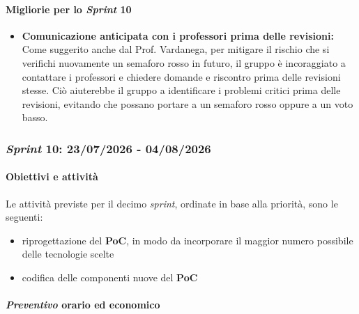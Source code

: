 \documentclass[12pt, a4paper]{article}
\begin{document}
{\paragraph{Migliorie per lo \textit{Sprint} 10}
\begin{itemize}
    \item \textbf{Comunicazione anticipata con i professori prima delle revisioni:}  Come suggerito anche dal Prof. Vardanega, per mitigare il rischio che si verifichi nuovamente un semaforo rosso in futuro, il gruppo è incoraggiato a contattare i professori e chiedere domande e riscontro prima delle revisioni stesse. Ciò aiuterebbe il gruppo a identificare i problemi critici prima delle revisioni, evitando che possano portare a un semaforo rosso oppure a un voto basso.
\end{itemize}


\subsubsection{\textit{Sprint} 10: 23/07/2026 - 04/08/2026}

\paragraph{Obiettivi e attività}

Le attività previste per il decimo \textit{sprint}, ordinate in base alla priorità, sono le seguenti:

\begin{itemize}
    \item riprogettazione del \textbf{PoC}, in modo da incorporare il maggior numero possibile delle tecnologie scelte
    \item codifica delle componenti nuove del \textbf{PoC}
\end{itemize}

\paragraph{\textit{Preventivo} orario ed economico}

}
\end{document}
